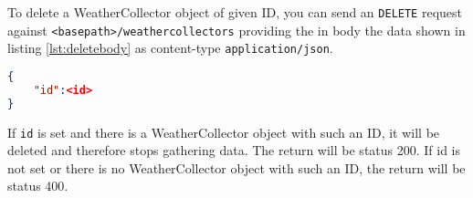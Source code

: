 To delete a WeatherCollector object of given ID, you can send an \texttt{DELETE} request against \texttt{<basepath>/weathercollectors} providing the in body the data shown in listing \ref{lst:deletebody} as content-type \texttt{application/json}.
\begin{lstlisting}[caption={Body of \texttt{DELETE} request endpoint}, label={lst:deletebody}, frame=single, language=json]
{ 
	"id":<id> 
}
\end{lstlisting}
If \texttt{id} is set and there is a WeatherCollector object with such an ID, it will be deleted and therefore stops gathering data. 
The return will be status 200. 
If id is not set or there is no WeatherCollector object with such an ID, the return will be status 400.


